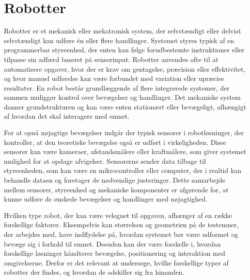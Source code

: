 \section{Robotter} \label{Robotter}

Robotter er et mekanisk eller mekatronisk system, der selvstændigt eller delvist selvstændigt kan udføre én eller flere handlinger. Systemet styres typisk af en programmerbar styreenhed, der enten kan følge forudbestemte instruktioner eller tilpasse sin adfærd baseret på sensorinput. Robotter anvendes ofte til at automatisere opgaver, hvor der er krav om gentagelse, præcision eller effektivitet, og hvor manuel udførelse kan være forbundet med variation eller upræcise resultater. En robot består grundlæggende af flere integrerede systemer, der sammen muliggør kontrol over bevægelser og handlinger. Det mekaniske system danner grundstrukturen og kan være enten stationært eller bevægeligt, afhængigt af hvordan det skal interagere med emnet. \parencite{TextbookofRobotics}



For at opnå nøjagtige bevægelser indgår der typisk sensorer i robotløsninger, der kontroller, at den teoretiske bevægelse også er udført i virkeligheden. Disse sensorer kan være kameraer, afstandsmålere eller kraftmålere, som giver systemet mulighed for at opdage afvigelser. Sensorerne sender data tilbage til styreenheden, som kan være en mikrocontroller eller computer, der i realtid kan behandle dataen og foretager de nødvendige justeringer. Dette samarbejde mellem sensorer, styreenhed og mekaniske komponenter er afgørende for, at kunne udføre de ønskede bevægelser og handlinger med nøjagtighed. \parencite{BasicsofRobotics}

Hvilken type robot, der kan være velegnet til opgaven, afhænger af en række forskellige faktorer. Eksempelvis kan størrelsen og geometrien på de testemner, der arbejdes med, have indflydelse på, hvordan systemet bør være udformet og bevæge sig i forhold til emnet. Desuden kan der være forskelle i, hvordan forskellige løsninger håndterer bevægelse, positionering og interaktion med omgivelserne. Derfor er det relevant at undersøge, hvilke forskellige typer af robotter der findes, og hvordan de adskiller sig fra hinanden.